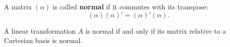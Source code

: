 A matrix $(\alpha)$ is called \textbf{normal} if it commutes with its transpose:
$$(\alpha)(\alpha)' = (\alpha)'(\alpha).$$

A linear transformation $A$ is normal if and only if its matrix relative to a Cartesian basis is normal.

